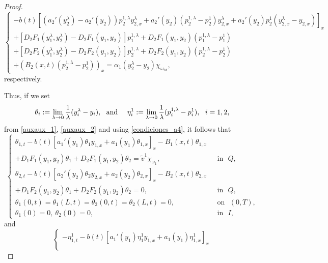 \documentclass[11pt,a4paper]{amsart}
\numberwithin{equation}{section}
\begin{document}
\begin{proof}
\begin{equation}
\begin{cases}
            -b(t)\left[ (a_2'(y_2^\lambda)-a_2'(y_2))p^{1,\lambda}_2 y^\lambda_{2,x} + a_2'(y_2)(p^{1,\lambda}_2-p^1_2)y^\lambda_{2,x} + a_2'(y_2)p^1_2 (y^\lambda_{2,x}-y_{2,x}) \right]_x\\
            +[D_2 F_1(y_1^\lambda,y_2^\lambda)-D_2 F_1(y_1,y_2)]p^{1,\lambda}_1 + D_2 F_1(y_1,y_2)(p^{1,\lambda}_1-p^{1}_1)\\
            +[D_2 F_2(y_1^\lambda,y_2^\lambda)-D_2 F_2(y_1,y_2)]p^{1,\lambda}_2 + D_2 F_2(y_1,y_2)(p^{1,\lambda}_2-p^{1}_2)\\
			+\left(B_2(x,t) (p^{1,\lambda}_2-p^{1}_2)\right)_x=\alpha_1\left( y^\lambda_2-y_2  \right)\chi_{\omega_{2d}},
		\end{cases}  
\end{equation}respectively. 

\noindent Thus, if we set 
\begin{equation*}
	 \theta_i:=\lim_{\lambda\to 0} \frac{1}{\lambda}(y^\lambda_i - y_i), \, \, \text{ and \, \, }	\eta^1_i:=\lim_{\lambda\to 0} \frac{1}{\lambda}(p_i^{1,\lambda} - p_i^1),  \ \ i=1,2, 
	\end{equation*}from \eqref{auxaux_1}, \eqref{auxaux_2} and using \eqref{condiciones_a4}, it follows that 
\begin{equation}\label{sistemaconvexo1}
	\begin{cases}
		\theta_{1,t}-b(t)\left[a_1'(y_{1})\theta_1 y_{1,x}+a_1(y_{1})\theta_{1,x}\right]_x-B_1(x,t)\theta_{1,x}\\
        +D_1 F_1(y_1,y_2)\theta_1 + D_2 F_1(y_1,y_2)\theta_2 = \widetilde{v}^1\chi_{\omega_1}, & \ \ \ \text{in} \ \ \ {Q},\\
		\theta_{2,t}-b(t)\left[a_2'(y_{2})\theta_2 y_{2,x}+a_2(y_{2})\theta_{2,x}\right]_x-B_2(x,t)\theta_{2,x}\\
        +D_1 F_2(y_1,y_2)\theta_1 + %
        D_2 F_2(y_1,y_2)\theta_2=0,& \ \ \ \text{in} \ \ \ {Q},\\
		\theta_1(0,t)=\theta_1(L,t)=\theta_2(0,t)=\theta_2(L,t)=0, & \ \ \ \text{on} \ \ \ (0,T),\\
		\theta_1(0)=0, \ \theta_2(0)=0, & \ \ \ \text{in} \ \ \ I,
	\end{cases}
\end{equation} and
    \begin{equation}\label{sistemaconvexo2}
		\begin{cases}
			-\eta^1_{1,t} %
            -b(t) \left[ a_1'(y_1)\eta^1_1 y_{1,x} + a_1(y_1) \eta^1_{1,x}\right]_x \\

\end{cases}
\end{equation}
\end{proof}
\end{document}
